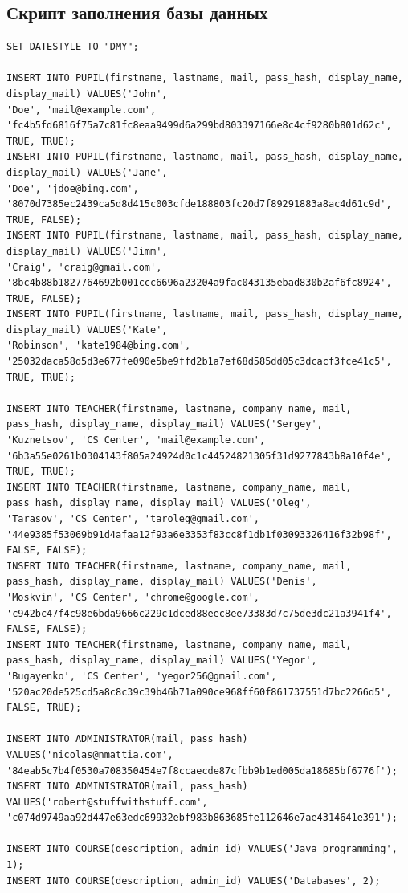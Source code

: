\documentclass[11pt]{article}
\begin{document}
\subsection{Скрипт заполнения базы данных}
\label{sec:org25d2f11}
\begin{verbatim}
SET DATESTYLE TO "DMY";

INSERT INTO PUPIL(firstname, lastname, mail, pass_hash, display_name, display_mail) VALUES('John',
'Doe', 'mail@example.com', 'fc4b5fd6816f75a7c81fc8eaa9499d6a299bd803397166e8c4cf9280b801d62c', TRUE, TRUE);
INSERT INTO PUPIL(firstname, lastname, mail, pass_hash, display_name, display_mail) VALUES('Jane',
'Doe', 'jdoe@bing.com', '8070d7385ec2439ca5d8d415c003cfde188803fc20d7f89291883a8ac4d61c9d', TRUE, FALSE);
INSERT INTO PUPIL(firstname, lastname, mail, pass_hash, display_name, display_mail) VALUES('Jimm',
'Craig', 'craig@gmail.com', '8bc4b88b1827764692b001ccc6696a23204a9fac043135ebad830b2af6fc8924', TRUE, FALSE);
INSERT INTO PUPIL(firstname, lastname, mail, pass_hash, display_name, display_mail) VALUES('Kate',
'Robinson', 'kate1984@bing.com', '25032daca58d5d3e677fe090e5be9ffd2b1a7ef68d585dd05c3dcacf3fce41c5', TRUE, TRUE);

INSERT INTO TEACHER(firstname, lastname, company_name, mail, pass_hash, display_name, display_mail) VALUES('Sergey',
'Kuznetsov', 'CS Center', 'mail@example.com', '6b3a55e0261b0304143f805a24924d0c1c44524821305f31d9277843b8a10f4e', TRUE, TRUE);
INSERT INTO TEACHER(firstname, lastname, company_name, mail, pass_hash, display_name, display_mail) VALUES('Oleg',
'Tarasov', 'CS Center', 'taroleg@gmail.com', '44e9385f53069b91d4afaa12f93a6e3353f83cc8f1db1f03093326416f32b98f', FALSE, FALSE);
INSERT INTO TEACHER(firstname, lastname, company_name, mail, pass_hash, display_name, display_mail) VALUES('Denis',
'Moskvin', 'CS Center', 'chrome@google.com', 'c942bc47f4c98e6bda9666c229c1dced88eec8ee73383d7c75de3dc21a3941f4', FALSE, FALSE);
INSERT INTO TEACHER(firstname, lastname, company_name, mail, pass_hash, display_name, display_mail) VALUES('Yegor',
'Bugayenko', 'CS Center', 'yegor256@gmail.com', '520ac20de525cd5a8c8c39c39b46b71a090ce968ff60f861737551d7bc2266d5', FALSE, TRUE);

INSERT INTO ADMINISTRATOR(mail, pass_hash) VALUES('nicolas@nmattia.com', '84eab5c7b4f0530a708350454e7f8ccaecde87cfbb9b1ed005da18685bf6776f');
INSERT INTO ADMINISTRATOR(mail, pass_hash) VALUES('robert@stuffwithstuff.com', 'c074d9749aa92d447e63edc69932ebf983b863685fe112646e7ae4314641e391');

INSERT INTO COURSE(description, admin_id) VALUES('Java programming', 1);
INSERT INTO COURSE(description, admin_id) VALUES('Databases', 2);


\end{verbatim}
\end{document}
